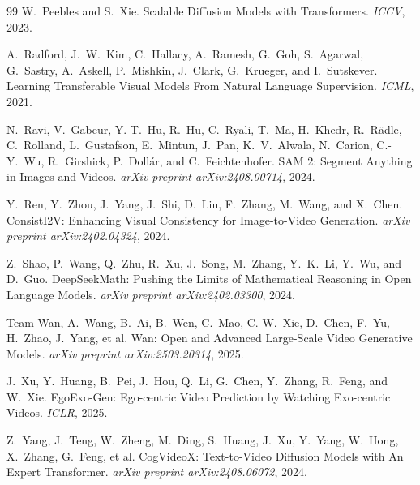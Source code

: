 \documentclass{article}
\begin{document}
\begin{thebibliography}{99}
W.\ Peebles and S.\ Xie.
\newblock Scalable Diffusion Models with Transformers.
\newblock \emph{ICCV}, 2023.

A.\ Radford, J.\ W.\ Kim, C.\ Hallacy, A.\ Ramesh, G.\ Goh, S.\ Agarwal,
G.\ Sastry, A.\ Askell, P.\ Mishkin, J.\ Clark, G.\ Krueger, and I.\ Sutskever.
\newblock Learning Transferable Visual Models From Natural Language Supervision.
\newblock \emph{ICML}, 2021.

N.\ Ravi, V.\ Gabeur, Y.-T.\ Hu, R.\ Hu, C.\ Ryali, T.\ Ma, H.\ Khedr,
R.\ R\"adle, C.\ Rolland, L.\ Gustafson, E.\ Mintun, J.\ Pan, K.\ V.\ Alwala,
N.\ Carion, C.-Y.\ Wu, R.\ Girshick, P.\ Doll\'ar, and C.\ Feichtenhofer.
\newblock SAM 2: Segment Anything in Images and Videos.
\newblock \emph{arXiv preprint arXiv:2408.00714}, 2024.

Y.\ Ren, Y.\ Zhou, J.\ Yang, J.\ Shi, D.\ Liu, F.\ Zhang, M.\ Wang, and
X.\ Chen.
\newblock ConsistI2V: Enhancing Visual Consistency for Image-to-Video
Generation.
\newblock \emph{arXiv preprint arXiv:2402.04324}, 2024.

Z.\ Shao, P.\ Wang, Q.\ Zhu, R.\ Xu, J.\ Song, M.\ Zhang, Y.\ K.\ Li, Y.\ Wu,
and D.\ Guo.
\newblock DeepSeekMath: Pushing the Limits of Mathematical Reasoning in Open
Language Models.
\newblock \emph{arXiv preprint arXiv:2402.03300}, 2024.

Team Wan, A.\ Wang, B.\ Ai, B.\ Wen, C.\ Mao, C.-W.\ Xie, D.\ Chen, F.\ Yu,
H.\ Zhao, J.\ Yang, et al.
\newblock Wan: Open and Advanced Large-Scale Video Generative Models.
\newblock \emph{arXiv preprint arXiv:2503.20314}, 2025.

J.\ Xu, Y.\ Huang, B.\ Pei, J.\ Hou, Q.\ Li, G.\ Chen, Y.\ Zhang, R.\ Feng, and
W.\ Xie.
\newblock EgoExo-Gen: Ego-centric Video Prediction by Watching Exo-centric
Videos.
\newblock \emph{ICLR}, 2025.

Z.\ Yang, J.\ Teng, W.\ Zheng, M.\ Ding, S.\ Huang, J.\ Xu, Y.\ Yang, W.\ Hong,
X.\ Zhang, G.\ Feng, et al.
\newblock CogVideoX: Text-to-Video Diffusion Models with An Expert
Transformer.
\newblock \emph{arXiv preprint arXiv:2408.06072}, 2024.

\end{thebibliography}
\end{document}
